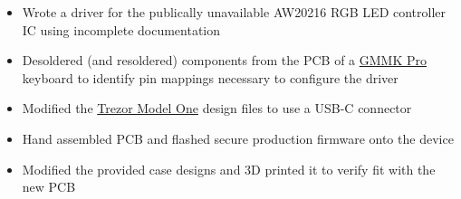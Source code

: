 \documentclass{resume}
\begin{document}
\begin{itemize}
    \item Wrote a driver for the publically unavailable AW20216 RGB LED controller IC using incomplete documentation
    \item Desoldered (and resoldered) components from the PCB of a \href{https://www.gloriousgaming.com/products/glorious-gmmk-pro-75-barebone-black}{GMMK Pro} keyboard to identify pin mappings necessary to configure the driver
\end{itemize}

\begin{itemize}
    \item Modified the \href{https://shop.trezor.io/product/trezor-one-white}{Trezor Model One} design files to use a USB-C connector
    \item Hand assembled PCB and flashed secure production firmware onto the device
    \item Modified the provided case designs and 3D printed it to verify fit with the new PCB
\end{itemize}

\Education

\end{document}
